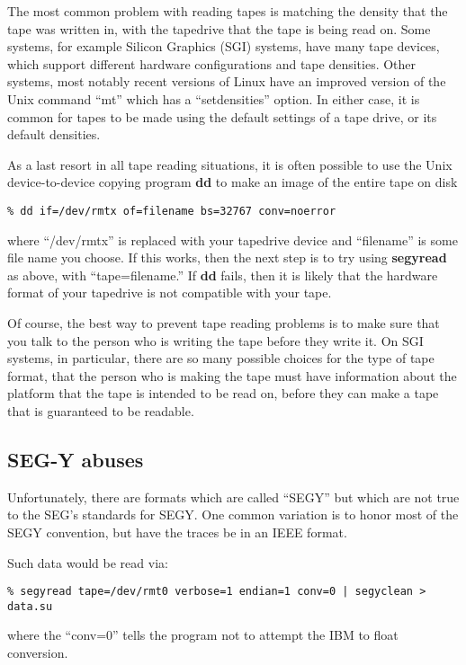 {{{The most common problem with reading tapes is matching the density
that the tape was written in, with the tapedrive that the tape is
being read on.
Some systems, for example Silicon Graphics (SGI) systems, have
many tape devices, which support different hardware configurations
and tape densities.
Other systems, most
notably recent versions of Linux have an improved version of the Unix
command ``mt'' which has a ``setdensities'' option.
In either case, it is common for tapes to be made using the default
settings of a tape drive, or its default densities. 

As a last resort in all tape reading situations, it is often possible to
use the Unix device-to-device copying program {\bf dd\/} to make an image
of the entire tape on disk
{\small \begin{verbatim}
% dd if=/dev/rmtx of=filename bs=32767 conv=noerror
\end{verbatim}}\noindent
where ``/dev/rmtx'' is replaced with your tapedrive device and ``filename''
is some file name you choose.
If this works, then the next step is to try using {\bf segyread\/} as above,
with ``tape=filename.''
If {\bf dd\/} fails, then it is likely that the hardware format
of your tapedrive is not compatible with your tape.

Of course, the best way to prevent tape reading problems is to
make sure that you talk to the person who is writing the tape
before they write it. On SGI systems, in particular, there are
so many possible choices for the type of tape format, that the
person who is making the tape must have information about the platform
that the tape is intended to be read on, before they can make a
tape that is guaranteed to be readable.

\subsection{SEG-Y abuses}

Unfortunately, there are formats which are called ``SEGY'' but which
are not true to the SEG's standards for SEGY.
One common variation is to honor most of the SEGY convention, but
have the traces be in an IEEE format.

Such data would be read via:
{\small\begin{verbatim}
% segyread tape=/dev/rmt0 verbose=1 endian=1 conv=0 | segyclean > data.su
\end{verbatim}}\noindent
where the ``conv=0'' tells the program not to attempt the IBM to float
conversion.

}}}
